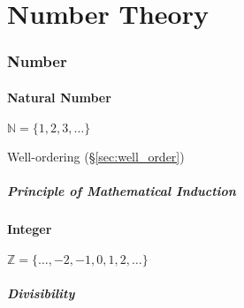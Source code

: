\part{Number Theory}\label{sec:number_theory}

\section{Number}\label{sec:number}

\subsection{Natural Number}\label{sec:natural_number}

$\mathbb{N} = \{ 1,2,3,\ldots \}$

Well-ordering (\S\ref{sec:well_order})



\subsubsection{Principle of Mathematical Induction}
\label{sec:induction_principle}



\subsection{Integer}\label{sec:integer}

$\mathbb{Z} = \{ \ldots, -2, -1, 0, 1, 2, \ldots \}$



\subsubsection{Divisibility}\label{sec:divisibility}

